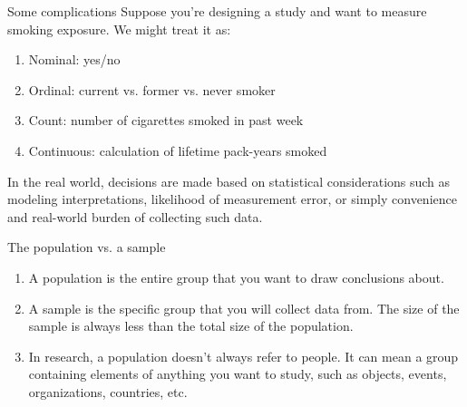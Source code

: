 \documentclass[12pt]{beamer}
\begin{document}
\begin{frame}{}
\begin{block}{Some complications}
Suppose you're designing a study and want to measure smoking exposure. We might treat it as:
\begin{enumerate}
\item Nominal: yes/no
\item Ordinal: current vs. former vs. never smoker
\item Count: number of cigarettes smoked in past week
\item Continuous: calculation of lifetime pack-years smoked
\end{enumerate}
In the real world, decisions are made based on statistical considerations such as modeling interpretations, likelihood of measurement error, or simply convenience and real-world burden of collecting such data.
\end{block}
\end{frame}

\begin{frame}{}
\begin{block}{The population vs. a sample}
\begin{enumerate}
\item A population is the entire group that you want to draw conclusions about.
\item A sample is the specific group that you will collect data from. The size of the sample is always less than the total size of the population.
\item In research, a population doesn’t always refer to people. It can mean a group containing elements of anything you want to study, such as objects, events, organizations, countries, etc.
\end{enumerate}
\end{block}
\end{frame}
\end{document}
